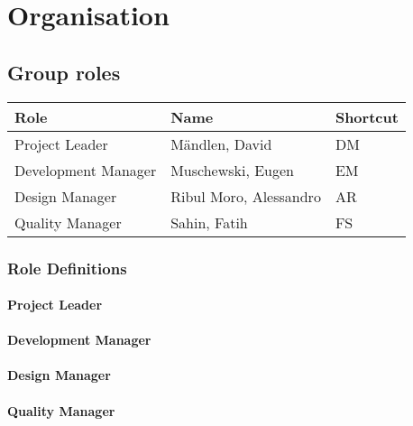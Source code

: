 \chapter{Organisation}
\section{Group roles}
\begin{table}[h]
	\begin{tabularx}{\textwidth}{XXX}
		Role & Name & Shortcut\\
		\toprule
		Project Leader & Mändlen, David & DM\\
		Development Manager & Muschewski, Eugen & EM\\
		Design Manager & Ribul Moro, Alessandro & AR\\
		Quality Manager & Sahin, Fatih & FS
	\end{tabularx}
\end{table}

\subsection{Role Definitions}
\subsubsection{Project Leader}
\subsubsection{Development Manager}
\subsubsection{Design Manager}
\subsubsection{Quality Manager}
